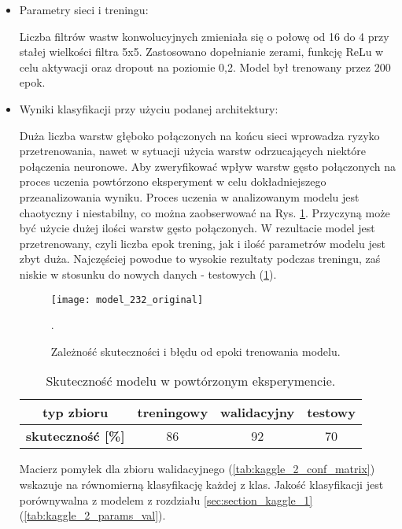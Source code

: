 {\begin{itemize}
\item Parametry sieci i treningu:

Liczba filtrów wastw konwolucyjnych zmieniała się o połowę od 16 do 4 przy stałej wielkości filtra 5x5. Zastosowano dopełnianie zerami, funkcję ReLu w celu aktywacji oraz dropout na poziomie 0,2. Model był trenowany przez 200 epok.

\item Wyniki klasyfikacji przy użyciu podanej architektury:

Duża liczba warstw głęboko połączonych na końcu sieci wprowadza ryzyko przetrenowania, nawet w sytuacji użycia warstw odrzucających niektóre połączenia neuronowe. Aby zweryfikować wpływ warstw gęsto połączonych na proces uczenia powtórzono eksperyment w celu dokładniejszego przeanalizowania wyniku. Proces uczenia w analizowanym modelu jest chaotyczny i niestabilny, co można zaobserwować na Rys. \ref{fig:kaggle_2_acc_trening}. Przyczyną może być użycie dużej ilości warstw gęsto połączonych. W rezultacie model jest przetrenowany, czyli liczba epok trening, jak i ilość parametrów modelu jest zbyt duża. Najczęściej powodue to wysokie rezultaty podczas treningu, zaś niskie w stosunku do nowych danych - testowych (\ref{tab:kaggle_2_acc_2}).

\begin{figure}[h!]
	\centering
	\centering
		\texttt{[image: model\_232\_original]}
	\caption{Zależność skuteczności i błędu od epoki trenowania modelu.}.
	\label{fig:kaggle_2_acc_trening}
\end{figure}

\begin{table}[h!]
\centering
\caption[Short Heading]{Skuteczność modelu w powtórzonym eksperymencie.}
\label{tab:kaggle_2_acc_2}
\begin{tabular}{|c|c|c|c|}
\hline
\textbf{typ zbioru}           & \textbf{treningowy} & \textbf{walidacyjny} & \textbf{testowy} \\ \hline
\textbf{skuteczność {[}\%{]}} & 86                  & 92                   & 70               \\ \hline
\end{tabular}
\end{table}

Macierz pomyłek dla zbioru walidacyjnego (\ref{tab:kaggle_2_conf_matrix}) wskazuje na równomierną klasyfikację każdej z klas. Jakość klasyfikacji jest porównywalna z modelem z rozdziału \ref{sec:section_kaggle_1} (\ref{tab:kaggle_2_params_val}).


\end{itemize}}
